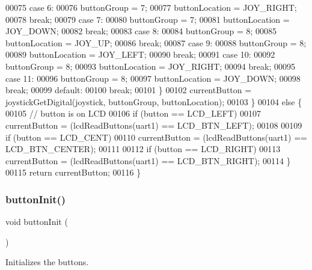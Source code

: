 \begin{DoxyCode}
00075         \textcolor{keywordflow}{case} 6:
00076             buttonGroup = 7;
00077             buttonLocation = JOY\_RIGHT;
00078             \textcolor{keywordflow}{break};
00079         \textcolor{keywordflow}{case} 7:
00080             buttonGroup = 7;
00081             buttonLocation = JOY\_DOWN;
00082             \textcolor{keywordflow}{break};
00083         \textcolor{keywordflow}{case} 8:
00084             buttonGroup = 8;
00085             buttonLocation = JOY\_UP;
00086             \textcolor{keywordflow}{break};
00087         \textcolor{keywordflow}{case} 9:
00088             buttonGroup = 8;
00089             buttonLocation = JOY\_LEFT;
00090             \textcolor{keywordflow}{break};
00091         \textcolor{keywordflow}{case} 10:
00092             buttonGroup = 8;
00093             buttonLocation = JOY\_RIGHT;
00094             \textcolor{keywordflow}{break};
00095         \textcolor{keywordflow}{case} 11:
00096             buttonGroup = 8;
00097             buttonLocation = JOY\_DOWN;
00098             \textcolor{keywordflow}{break};
00099         \textcolor{keywordflow}{default}:
00100             \textcolor{keywordflow}{break};
00101         \}
00102         currentButton = joystickGetDigital(joystick, buttonGroup, buttonLocation);
00103     \}
00104     \textcolor{keywordflow}{else} \{
00105         \textcolor{comment}{// button is on LCD}
00106         \textcolor{keywordflow}{if} (button == LCD_LEFT)
00107             currentButton = (lcdReadButtons(uart1) == LCD\_BTN\_LEFT);
00108 
00109         \textcolor{keywordflow}{if} (button == LCD_CENT)
00110             currentButton = (lcdReadButtons(uart1) == LCD\_BTN\_CENTER);
00111 
00112         \textcolor{keywordflow}{if} (button == LCD_RIGHT)
00113             currentButton = (lcdReadButtons(uart1) == LCD\_BTN\_RIGHT);
00114     \}
00115     \textcolor{keywordflow}{return} currentButton;
00116 \}
\end{DoxyCode}
\mbox{\label{toggle_8h_a2b3d226371575c894979ab84bce95626}} 
\subsubsection{button\+Init()}
{\footnotesize\ttfamily void button\+Init (\begin{DoxyParamCaption}{ }\end{DoxyParamCaption})}



Initializes the buttons. 

